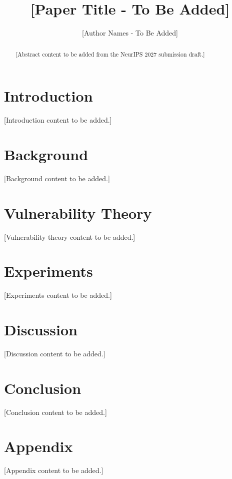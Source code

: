 \documentclass{article}
\title{[Paper Title - To Be Added]}
\author{[Author Names - To Be Added]}
\date{}
\begin{document}
\maketitle

\begin{abstract}
[Abstract content to be added from the NeurIPS 2027 submission draft.]
\end{abstract}

\section{Introduction}
[Introduction content to be added.]

\section{Background}
[Background content to be added.]

\section{Vulnerability Theory}
[Vulnerability theory content to be added.]

\section{Experiments}
[Experiments content to be added.]

\section{Discussion}
[Discussion content to be added.]

\section{Conclusion}
[Conclusion content to be added.]




\appendix
\section{Appendix}
[Appendix content to be added.]
\end{document}
